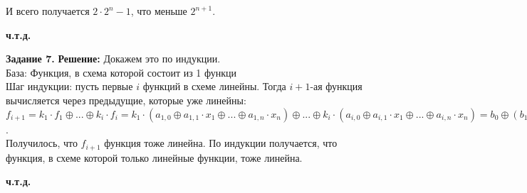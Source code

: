 \documentclass[12pt,a4paper]{scrartcl}
\begin{document}
	И всего получается $2 \cdot 2^n - 1$, что меньше $2^{n + 1}.$
	\begin{flushright}
		\textbf{ч.т.д.}
	\end{flushright}
	\textbf{Задание 7.}
	\newline
	\textbf{Решение:}
	\newline
	\indent
	Докажем это по индукции.\\
	База: Функция, в схема которой состоит из 1 функци\\
	Шаг индукции: пусть первые $i$ функций в схеме линейны. Тогда $i + 1$-ая функция вычисляется через предыдущие, которые уже линейны: \\
	$f_{i + 1} = k_1 \cdot f_1 \oplus ... \oplus k_i \cdot f_i = k_1 \cdot (a_{1, 0} \oplus a_{1, 1} \cdot x_1 \oplus ... \oplus a_{1, n} \cdot x_n) \oplus ... \oplus k_i \cdot (a_{i, 0} \oplus a_{i, 1} \cdot x_1 \oplus ... \oplus a_{i, n} \cdot x_n) = b_0 \oplus (b_1 \land x_1) \oplus ... \oplus (b_n \land x_n)$. \\
	Получилось, что $f_{i + 1}$ функция тоже линейна. По индукции получается, что функция, в схеме которой только линейные функции, тоже линейна. 
	\begin{flushright}
		\textbf{ч.т.д.}
	\end{flushright}
\end{document}

